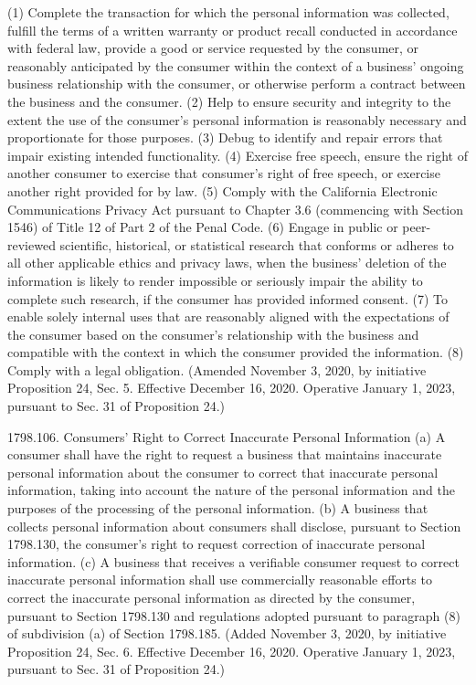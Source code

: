 (1) Complete the transaction for which the personal information was collected, fulfill the terms of a written warranty or product recall conducted in accordance with federal law, provide a good or service requested by the consumer, or reasonably anticipated by the consumer within the context of a business’ ongoing business relationship with the consumer, or otherwise perform a contract between the business and the consumer.
(2) Help to ensure security and integrity to the extent the use of the consumer’s personal information is reasonably necessary and proportionate for those purposes.
(3) Debug to identify and repair errors that impair existing intended functionality.
(4) Exercise free speech, ensure the right of another consumer to exercise that consumer’s right of free speech, or exercise another right provided for by law.
(5) Comply with the California Electronic Communications Privacy Act pursuant to Chapter 3.6 (commencing with Section 1546) of Title 12 of Part 2 of the Penal Code.
(6) Engage in public or peer-reviewed scientific, historical, or statistical research that conforms or adheres to all other applicable ethics and privacy laws, when the business’ deletion of the information is likely to render impossible or seriously impair the ability to complete such research, if the consumer has provided informed consent.
(7) To enable solely internal uses that are reasonably aligned with the expectations of the consumer based on the consumer’s relationship with the business and compatible with the context in which the consumer provided the information.
(8) Comply with a legal obligation.
(Amended November 3, 2020, by initiative Proposition 24, Sec. 5. Effective December 16, 2020. Operative January 1, 2023, pursuant to Sec. 31 of Proposition 24.)

1798.106.  Consumers’ Right to Correct Inaccurate Personal Information
(a) A consumer shall have the right to request a business that maintains inaccurate personal information about the consumer to correct that inaccurate personal information, taking into account the nature of the personal information and the purposes of the processing of the personal information.
(b) A business that collects personal information about consumers shall disclose, pursuant to Section 1798.130, the consumer’s right to request correction of inaccurate personal information.
(c) A business that receives a verifiable consumer request to correct inaccurate personal information shall use commercially reasonable efforts to correct the inaccurate personal information as directed by the consumer, pursuant to Section 1798.130 and regulations adopted pursuant to paragraph (8) of subdivision (a) of Section 1798.185.
(Added November 3, 2020, by initiative Proposition 24, Sec. 6. Effective December 16, 2020. Operative January 1, 2023, pursuant to Sec. 31 of Proposition 24.)

